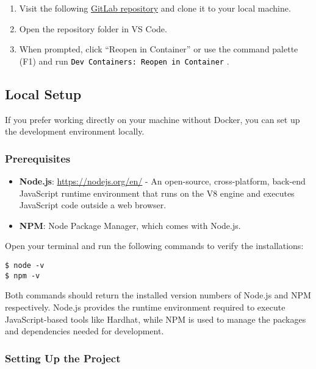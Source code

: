 \documentclass[12pt]{article}
\newcommand{\codegrey}[1]{%
  \texttt{\colorbox{black!4}{\textcolor{black}{#1}}}%
}
\begin{document}
\begin{enumerate}
  \item Visit the following \href{https://gitlab.fel.cvut.cz/radovluk/smart-contracts-exercises/-/tree/main/02-Decentralized-Voting-System/task/task-code?ref_type=heads}{GitLab repository} and clone it to your local machine.
  \item Open the repository folder in VS Code.
  \item When prompted, click ``Reopen in Container'' or use the command palette (F1) and run \codegrey{Dev Containers: Reopen in Container}.
\end{enumerate}

\subsection{Local Setup}

If you prefer working directly on your machine without Docker, you can set up the development environment locally.

\subsubsection*{Prerequisites}
\begin{itemize}
    \item \textbf{Node.js}: \url{https://nodejs.org/en/} - An open-source, cross-platform, back-end JavaScript runtime environment that runs on the V8 engine and executes JavaScript code outside a web browser.
    \item \textbf{NPM}: Node Package Manager, which comes with Node.js.
\end{itemize}

\noindent
Open your terminal and run the following commands to verify the installations:

\begin{verbatim}
$ node -v
$ npm -v
\end{verbatim}

Both commands should return the installed version numbers of Node.js and NPM respectively. Node.js provides the runtime environment required to execute JavaScript-based tools like Hardhat, while NPM is used to manage the packages and dependencies needed for development.

\subsubsection*{Setting Up the Project}
\end{document}
